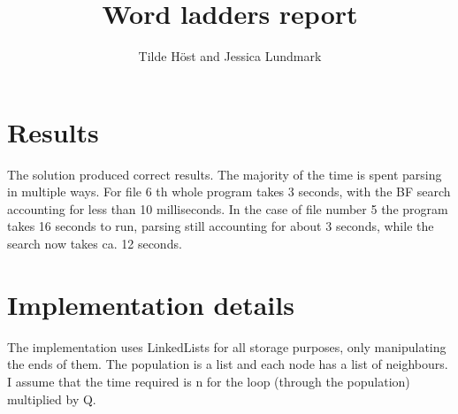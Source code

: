 \documentclass{article}
\title{Word ladders report}
\author{Tilde Höst and Jessica Lundmark}
\begin{document}
  \maketitle

  \section{Results}

  The solution produced correct results. The majority of the time is spent parsing in multiple ways. For file 6 th whole program takes 3 seconds, with the BF search accounting for less than 10 milliseconds.
  In the case of file number 5 the program takes 16 seconds to run, parsing still accounting for about 3 seconds, while the search now takes ca. 12 seconds.
  \section{Implementation details}

    The implementation uses LinkedLists for all storage purposes, only manipulating the ends of them. The population is a list and each node has a list of neighbours.
    I assume that the time required is n for the loop (through the population) multiplied by Q.
\end{document}
